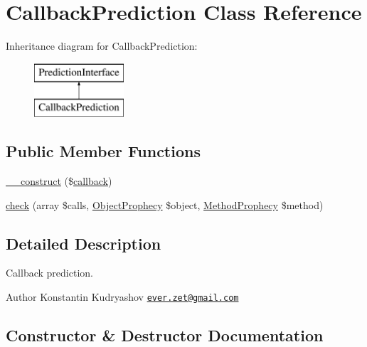 \hypertarget{class_prophecy_1_1_prediction_1_1_callback_prediction}{}\section{Callback\+Prediction Class Reference}
\label{class_prophecy_1_1_prediction_1_1_callback_prediction}
Inheritance diagram for Callback\+Prediction\+:\begin{figure}[H]
\begin{center}
\leavevmode
\includegraphics[height=2.000000cm]{class_prophecy_1_1_prediction_1_1_callback_prediction}
\end{center}
\end{figure}
\subsection*{Public Member Functions}
\begin{DoxyCompactItemize}
\item 
\mbox{\hyperlink{class_prophecy_1_1_prediction_1_1_callback_prediction_aae70a2214e4c3d274a97b54e983b5fdf}{\+\_\+\+\_\+construct}} (\$\mbox{\hyperlink{_functions_8php_ae2242eb47799ca6a822b022dc1bd1ac9}{callback}})
\item 
\mbox{\hyperlink{class_prophecy_1_1_prediction_1_1_callback_prediction_a8753cea9fc952add136830abab587633}{check}} (array \$calls, \mbox{\hyperlink{class_prophecy_1_1_prophecy_1_1_object_prophecy}{Object\+Prophecy}} \$object, \mbox{\hyperlink{class_prophecy_1_1_prophecy_1_1_method_prophecy}{Method\+Prophecy}} \$method)
\end{DoxyCompactItemize}


\subsection{Detailed Description}
Callback prediction.

\begin{DoxyAuthor}{Author}
Konstantin Kudryashov \href{mailto:ever.zet@gmail.com}{\tt ever.\+zet@gmail.\+com} 
\end{DoxyAuthor}


\subsection{Constructor \& Destructor Documentation}
\mbox{\label{class_prophecy_1_1_prediction_1_1_callback_prediction_aae70a2214e4c3d274a97b54e983b5fdf}} 
